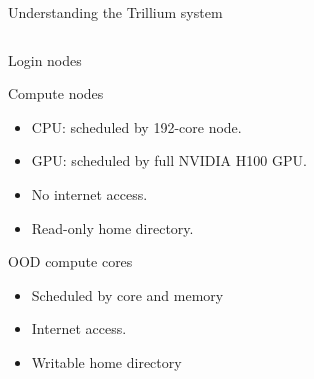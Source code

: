 \documentclass[
  10pt,
  ignorenonframetext,
  aspectratio=169]{beamer}
\providecommand{\tightlist}{%
  \setlength{\itemsep}{0pt}\setlength{\parskip}{0pt}}
\begin{document}
\begin{frame}{Understanding the Trillium system}
\begin{columns}[T]
\begin{column}{0.47\linewidth}
\begin{block}{Login nodes}
\pause
\end{block}

\begin{block}{Compute nodes}\setlength{\parskip}{0.5\baselineskip}
\label{compute-nodes}
\vspace{-1mm}

\begin{itemize}
\tightlist
\item
  CPU: scheduled by 192-core node.
\item
  GPU: scheduled by full NVIDIA H100 GPU.
\item
  No internet access.
\item
  Read-only home directory.
\end{itemize}

\pause
\end{block}

\begin{block}{OOD compute cores}\setlength{\parskip}{0.5\baselineskip}
\label{ood-compute-cores}
\vspace{-1mm}

\begin{itemize}
\tightlist
\item
  Scheduled by core and memory
\item
  Internet access.
\item
  Writable home directory
\end{itemize}
\end{block}
\end{column}
\end{columns}
\end{frame}
\end{document}
